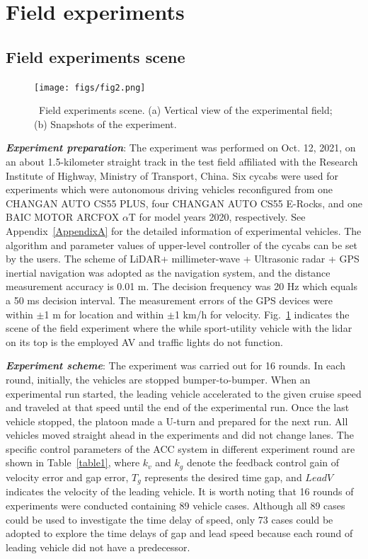 \documentclass[journal]{IEEEtran}
\begin{document}
\section{Field experiments}
\label{Section 3}

\subsection{Field experiments scene}
\label{Section 3.1}

\begin{figure}
  \centering
  \texttt{[image: figs/fig2.png]}
  \caption{~Field experiments scene. (a) Vertical view of the experimental field; (b) Snapshots of the experiment.}
  \label{fig2}
\end{figure}

\textbf{\emph{Experiment preparation}}: The experiment was performed on Oct. 12, 2021, on an about 1.5-kilometer straight track in the test field affiliated with the Research Institute of Highway, Ministry of Transport, China. Six cycabs were used for experiments which were autonomous driving vehicles reconfigured from one CHANGAN AUTO CS55 PLUS, four CHANGAN AUTO CS55 E-Rocks, and one BAIC MOTOR ARCFOX $\alpha$T for model years 2020, respectively. See Appendix~\ref{AppendixA} for the detailed information of experimental vehicles. The algorithm and parameter values of upper-level controller of the cycabs can be set by the users. The scheme of LiDAR+ millimeter-wave + Ultrasonic radar + GPS inertial navigation was adopted as the navigation system, and the distance measurement accuracy is 0.01 m. The decision frequency was 20 Hz which equals a 50 ms decision interval. The measurement errors of the GPS devices were within $\pm$1 m for location and within $\pm$1 km/h for velocity. Fig.~\ref{fig2} indicates the scene of the field experiment where the while sport-utility vehicle with the lidar on its top is the employed AV and traffic lights do not function.

\textbf{\emph{Experiment scheme}}: The experiment was carried out for 16 rounds. In each round, initially, the vehicles are stopped bumper-to-bumper. When an experimental run started, the leading vehicle accelerated to the given cruise speed and traveled at that speed until the end of the experimental run. Once the last vehicle stopped, the platoon made a U-turn and prepared for the next run. All vehicles moved straight ahead in the experiments and did not change lanes. The specific control parameters of the ACC system in different experiment round are shown in Table~\ref{table1}, where $k_{v}$ and $k_{g}$ denote the feedback control gain of velocity error and gap error, $T_{g}$ represents the desired time gap, and $LeadV$ indicates the velocity of the leading vehicle. It is worth noting that 16 rounds of experiments were conducted containing 89 vehicle cases. Although all 89 cases could be used to investigate the time delay of speed, only 73 cases could be adopted to explore the time delays of gap and lead speed because each round of leading vehicle did not have a predecessor.
\end{document}
